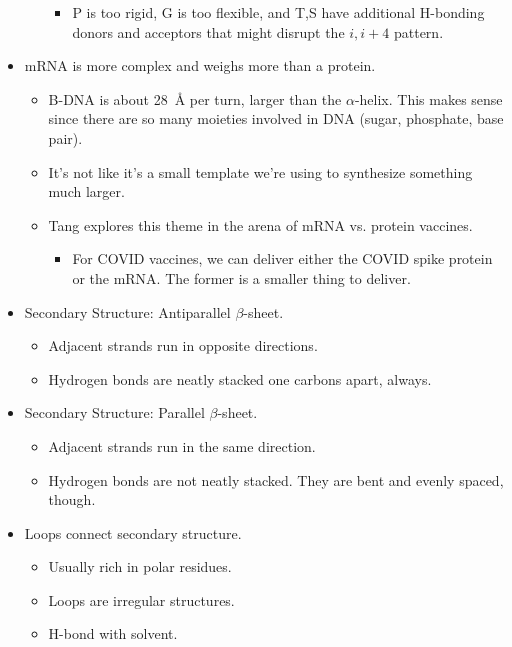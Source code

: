 \documentclass[../notes.tex]{subfiles}
\begin{document}
\begin{itemize}
\begin{itemize}
        \begin{itemize}
            \item P is too rigid, G is too flexible, and T,S have additional H-bonding donors and acceptors that might disrupt the $i,i+4$ pattern.
        \end{itemize}
    \end{itemize}
    \item mRNA is more complex and weighs more than a protein.
    \begin{itemize}
        \item B-DNA is about \SI{28}{\angstrom} per turn, larger than the $\alpha$-helix. This makes sense since there are so many moieties involved in DNA (sugar, phosphate, base pair).
        \item It's not like it's a small template we're using to synthesize something much larger.
        \item Tang explores this theme in the arena of mRNA vs. protein vaccines.
        \begin{itemize}
            \item For COVID vaccines, we can deliver either the COVID spike protein or the mRNA. The former is a smaller thing to deliver.
        \end{itemize}
    \end{itemize}
    \item Secondary Structure: Antiparallel $\beta$-sheet.
    \begin{itemize}
        \item Adjacent strands run in opposite directions.
        \item Hydrogen bonds are neatly stacked one carbons apart, always.
    \end{itemize}
    \item Secondary Structure: Parallel $\beta$-sheet.
    \begin{itemize}
        \item Adjacent strands run in the same direction.
        \item Hydrogen bonds are not neatly stacked. They are bent and evenly spaced, though.
    \end{itemize}
    \item Loops connect secondary structure.
    \begin{itemize}
        \item Usually rich in polar residues.
        \item Loops are irregular structures.
        \item H-bond with solvent.

\end{itemize}
\end{itemize}
\end{document}
